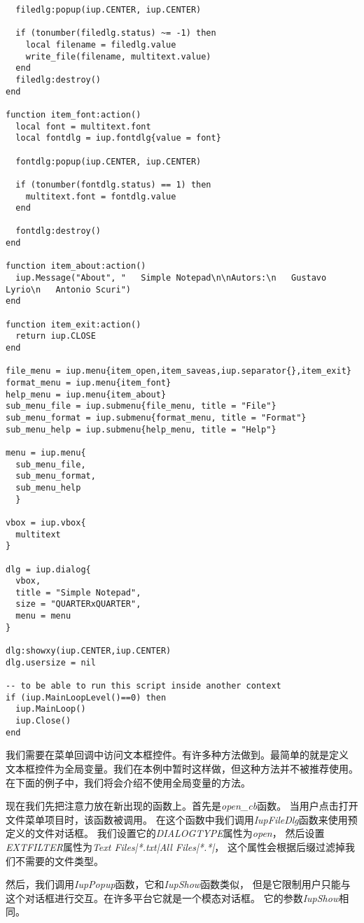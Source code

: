 \documentclass{ctexart}
\begin{document}
\begin{lstlisting}
  filedlg:popup(iup.CENTER, iup.CENTER)

  if (tonumber(filedlg.status) ~= -1) then
    local filename = filedlg.value
    write_file(filename, multitext.value)
  end
  filedlg:destroy()
end

function item_font:action()
  local font = multitext.font
  local fontdlg = iup.fontdlg{value = font}

  fontdlg:popup(iup.CENTER, iup.CENTER)

  if (tonumber(fontdlg.status) == 1) then
    multitext.font = fontdlg.value
  end

  fontdlg:destroy()
end

function item_about:action()
  iup.Message("About", "   Simple Notepad\n\nAutors:\n   Gustavo Lyrio\n   Antonio Scuri")
end

function item_exit:action()
  return iup.CLOSE
end

file_menu = iup.menu{item_open,item_saveas,iup.separator{},item_exit}
format_menu = iup.menu{item_font}
help_menu = iup.menu{item_about}
sub_menu_file = iup.submenu{file_menu, title = "File"}
sub_menu_format = iup.submenu{format_menu, title = "Format"}
sub_menu_help = iup.submenu{help_menu, title = "Help"}

menu = iup.menu{
  sub_menu_file, 
  sub_menu_format, 
  sub_menu_help
  }

vbox = iup.vbox{
  multitext
}

dlg = iup.dialog{
  vbox,
  title = "Simple Notepad",
  size = "QUARTERxQUARTER",
  menu = menu
}

dlg:showxy(iup.CENTER,iup.CENTER)
dlg.usersize = nil

-- to be able to run this script inside another context
if (iup.MainLoopLevel()==0) then
  iup.MainLoop()
  iup.Close()
end
\end{lstlisting}

我们需要在菜单回调中访问文本框控件。有许多种方法做到。最简单的就是定义
文本框控件为全局变量。我们在本例中暂时这样做，但这种方法并不被推荐使用。
在下面的例子中，我们将会介绍不使用全局变量的方法。

现在我们先把注意力放在新出现的函数上。首先是\emph{open\_cb}函数。
当用户点击打开文件菜单项目时，该函数被调用。
在这个函数中我们调用\emph{IupFileDlg}函数来使用预定义的文件对话框。
我们设置它的\emph{DIALOGTYPE}属性为\emph{open}，
然后设置\emph{EXTFILTER}属性为\emph{Text Files|*.txt|All Files|*.*|}，
这个属性会根据后缀过滤掉我们不需要的文件类型。

然后，我们调用\emph{IupPopup}函数，它和\emph{IupShow}函数类似，
但是它限制用户只能与这个对话框进行交互。在许多平台它就是一个模态对话框。
它的参数\emph{IupShow}相同。
\end{document}
